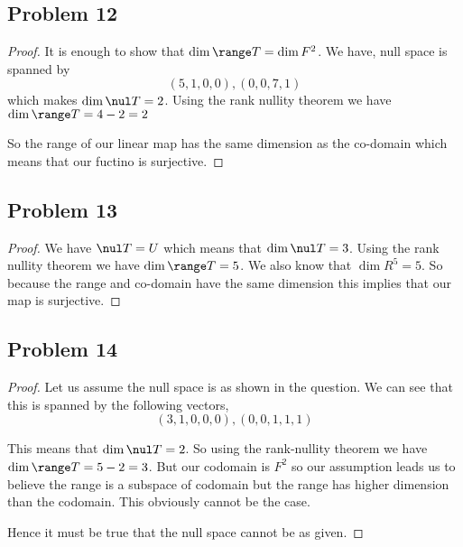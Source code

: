 \documentclass[a4paper]{report}
\begin{document}
\subsection*{Problem 12}
\begin{proof}
    It is enough to show that $\dim \range T = \dim F^{2}$. We have, null space is spanned by 
    $$ (5,1,0,0), (0,0,7,1) $$ which makes $\dim \nul T = 2$. Using the rank nullity theorem we have $\dim \range T = 4 -2 = 2 $

    So the range of our linear map has the same dimension as the co-domain which means that our fuctino is surjective.
\end{proof}

\subsection*{Problem 13}
\begin{proof}
    
We have $\nul T = U$ which means that $\dim \nul T = 3$. Using the rank nullity theorem we have $\dim \range T = 5$. We also know that $\dim R^{5} = 5$. So because the range and co-domain have the same dimension this implies that our map is surjective.

\end{proof}
\subsection*{Problem 14}
\begin{proof}
    
Let us assume the null space is as shown in the question. We can see that this is spanned by the following vectors,  
$$ (3,1,0,0,0), (0,0,1,1,1) $$ 

This means that $\dim \nul T = 2$. So using the rank-nullity theorem we have  $\dim \range T = 5 - 2 = 3$. But our codomain is  $F^{2}$ so our assumption leads us to believe the range is a subspace of codomain but the range has higher dimension than the codomain. This  obviously cannot be the case. 

Hence it must be true that the null space cannot be as given.

\end{proof}
\end{document}
